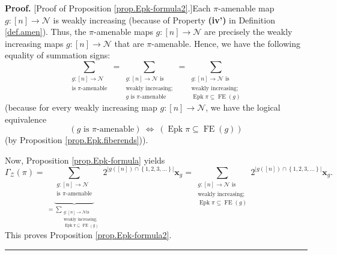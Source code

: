 \documentclass[numbers=enddot,12pt,final,onecolumn,notitlepage]{scrartcl}%
\theoremstyle{definition}
\newenvironment{proof}[1][Proof]{\noindent\textbf{#1.} }{\ \rule{0.5em}{0.5em}}
\newenvironment{verlong}{}{}
\let\sumnonlimits\sum
\renewcommand{\sum}{\sumnonlimits\limits}
\begin{document}
\begin{verlong}
\begin{proof}
[Proof of Proposition \ref{prop.Epk-formula2}.]Each $\pi$-amenable map
$g:\left[  n\right]  \rightarrow\mathcal{N}$ is weakly increasing (because of
Property \textbf{(iv')} in Definition \ref{def.amen}). Thus, the $\pi
$-amenable maps $g:\left[  n\right]  \rightarrow\mathcal{N}$ are precisely the
weakly increasing maps $g:\left[  n\right]  \rightarrow\mathcal{N}$ that are
$\pi$-amenable. Hence, we have the following equality of summation signs:%
\[
\sum_{\substack{g:\left[  n\right]  \rightarrow\mathcal{N}\\\text{is }%
\pi\text{-amenable}}}=\sum_{\substack{g:\left[  n\right]  \rightarrow
\mathcal{N}\text{ is}\\\text{weakly increasing;}\\g\text{ is }\pi
\text{-amenable}}}=\sum_{\substack{g:\left[  n\right]  \rightarrow
\mathcal{N}\text{ is}\\\text{weakly increasing;}\\
\operatorname{Epk} \pi\subseteq\operatorname*{FE}\left(  g\right)  }}
\]
(because for every weakly increasing map $g:\left[  n\right]  \rightarrow
\mathcal{N}$, we have the logical equivalence%
\[
\left(  g\text{ is }\pi\text{-amenable}\right)  \ \Longleftrightarrow\ \left(
\operatorname{Epk}\pi\subseteq\operatorname*{FE}\left(  g\right)  \right)
\]
(by Proposition \ref{prop.Epk.fiberends})).

Now, Proposition \ref{prop.Epk-formula} yields%
\[
\Gamma_{\mathcal{Z}}\left(  \pi\right)  =\underbrace{\sum_{\substack{g:\left[
n\right]  \rightarrow\mathcal{N}\\\text{is }\pi\text{-amenable}}}}%
_{=\sum_{\substack{g:\left[  n\right]  \rightarrow\mathcal{N}\text{
is}\\\text{weakly increasing;}\\\operatorname{Epk}\pi\subseteq
\operatorname*{FE}\left(  g\right)  }}}2^{\left\vert g\left(  \left[
n\right]  \right)  \cap\left\{  1,2,3,\ldots\right\}  \right\vert }%
\mathbf{x}_{g}=\sum_{\substack{g:\left[  n\right]  \rightarrow\mathcal{N}%
\text{ is}\\\text{weakly increasing;}\\\operatorname{Epk}\pi\subseteq
\operatorname*{FE}\left(  g\right)  }}2^{\left\vert g\left(  \left[  n\right]
\right)  \cap\left\{  1,2,3,\ldots\right\}  \right\vert }\mathbf{x}_{g}.
\]
This proves Proposition \ref{prop.Epk-formula2}.
\end{proof}
\end{verlong}
\end{document}
